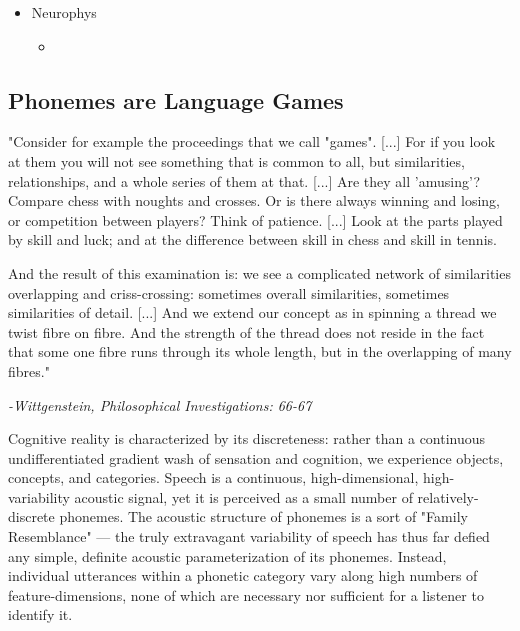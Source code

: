 \begin{multicols}{2}
\begin{itemize}
	\item Neurophys
	\begin{itemize}
		\item 
	\end{itemize}

\end{itemize}


\subsection{Phonemes are Language Games}

\begin{leftbar}

"Consider for example the proceedings that we call "games". [...] For if you look at them you will not see something that is common to all, but similarities, relationships, and a whole series of them at that. [...] Are they all 'amusing'? Compare chess with noughts and crosses. Or is there always winning and losing, or competition between players? Think of patience. [...] Look at the parts played by skill and luck; and at the difference between skill in chess and skill in tennis. 

And the result of this examination is: we see a complicated network
of similarities overlapping and criss-crossing: sometimes overall similarities, sometimes similarities of detail. [...] And we extend our concept as in spinning a thread we twist fibre on fibre. And the strength of the thread does not reside in the fact that some one fibre runs through its whole length, but in the overlapping of many fibres."

\textit{-Wittgenstein, Philosophical Investigations: 66-67\cite{wittgensteinPhilosophicalInvestigations1968}}

\end{leftbar}

Cognitive reality is characterized by its discreteness: rather than a continuous undifferentiated gradient wash of sensation and cognition, we experience objects, concepts, and categories. Speech is a continuous, high-dimensional, high-variability acoustic signal, yet it is perceived as a small number of relatively-discrete phonemes\cite{holtSpeechPerceptionCategorization2010a}. The acoustic structure of phonemes is a sort of "Family Resemblance"\cite{wittgensteinPhilosophicalInvestigations1968} --- the truly extravagant variability of speech has thus far defied any simple, definite acoustic parameterization of its phonemes. Instead, individual utterances within a phonetic category vary along high numbers of feature-dimensions, none of which are necessary nor sufficient for a listener to identify it\cite{Lisker1977,Bailey1980}.


\end{multicols}
